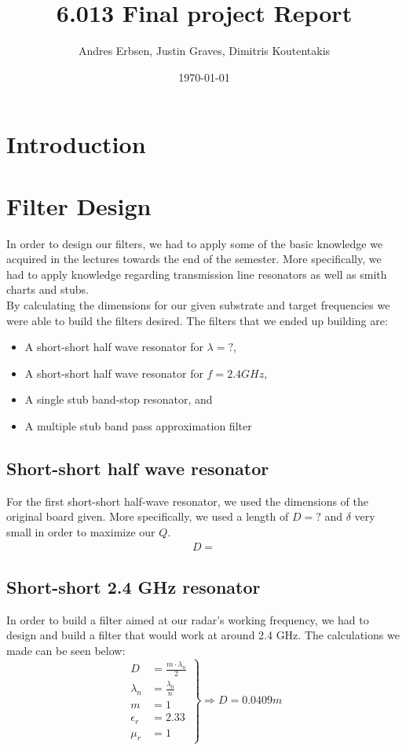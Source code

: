 \documentclass[letterpaper, 12pt]{article}
\begin{document}
\title{6.013 Final project Report}
\author{Andres Erbsen, Justin Graves, Dimitris Koutentakis}
\date{\today}
\maketitle
\vspace{5mm}
\tableofcontents
\clearpage
\section{Introduction}
\section{Filter Design}
In order to design our filters, we had to apply some of the basic knowledge we acquired in the lectures towards the end of the semester. More specifically, we had to apply knowledge regarding transmission line resonators as well as smith charts and stubs.
\\
By calculating the dimensions for our given substrate and target frequencies we were able to build the filters desired. The filters that we ended up building are:
\begin{itemize}
    \item A short-short half wave resonator for $\lambda=?$,
    \item A short-short half wave resonator for $f=2.4 GHz$,
    \item A single stub band-stop resonator, and
    \item A multiple stub band pass approximation filter
\end{itemize}
\subsection{Short-short half wave resonator}
For the first short-short half-wave resonator, we used the dimensions of the original board given. More specifically, we used a length of $D=?$ and $\delta$ very small in order to maximize our $Q$. 
\begin{align*}
    D=
\end{align*}
\subsection{Short-short 2.4 GHz resonator}
In order to build a filter aimed at our radar's working frequency, we had to design and build a filter that would work at around 2.4 GHz. The calculations we made can be seen below:
\begin{equation*}
\left.
\begin{aligned}
    D&=\frac{m\cdot\lambda_n}{2} \\
    \lambda_n&=\frac{\lambda_0}{n}\\
    m&=1 \\
    \epsilon_r&=2.33 \\
    \mu_r&=1
\end{aligned}
\right \}
\Longrightarrow
D=0.0409m
\end{equation*}
\end{document}
